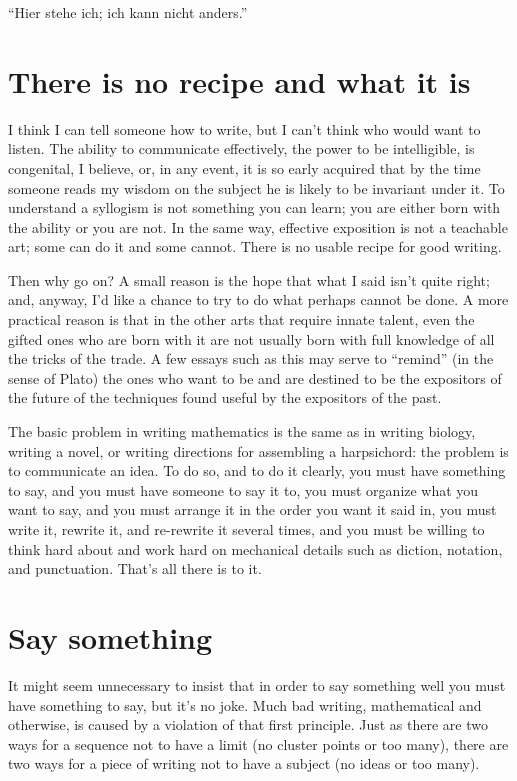 \documentclass[12pt]{article}
\begin{document}
``Hier stehe ich; ich kann nicht anders.''

\section{There is no recipe and what it is}

I think I can tell someone how to write, but I can't think who would want to listen. The ability to communicate effectively, the power to be intelligible, is congenital, I believe, or, in any event, it is so early acquired that by the time someone reads my wisdom on the subject he is likely to be invariant under it. To understand a syllogism is not something you can learn; you are either born with the ability or you are not. In the same way, effective exposition is not a teachable art; some can do it and some cannot. There is no usable recipe for good writing.

Then why go on? A small reason is the hope that what I said isn't quite right; and, anyway, I'd like a chance to try to do what perhaps cannot be done. A more practical reason is that in the other arts that require innate talent, even the gifted ones who are born with it are not usually born with full knowledge of all the tricks of the trade. A few essays such as this may serve to ``remind'' (in the sense of Plato) the ones who want to be and are destined to be the expositors of the future of the techniques found useful by the expositors of the past. 

The basic problem in writing mathematics is the same as in writing biology, writing a novel, or writing directions for assembling a harpsichord: the problem is to communicate an idea. To do so, and to do it clearly, you must have something to say, and you must have someone to say it to, you must organize what you want to say, and you must arrange it in the order you want it said in, you must write it, rewrite it, and re-rewrite it several times, and you must be willing to think hard about and work hard on mechanical details such as diction, notation, and punctuation. That's all there is to it.

\section{Say something}

It might seem unnecessary to insist that in order to say something well you must have something to say, but it's no joke. Much bad writing, mathematical and otherwise, is caused by a violation of that first principle. Just as there are two ways for a sequence not to have a limit (no cluster points or too many), there are two ways for a piece of writing not to have a subject (no ideas or too many). 
\end{document}
